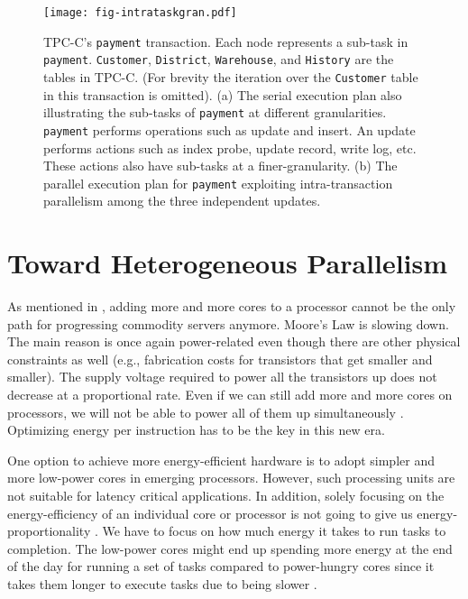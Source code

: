 \documentclass[11pt]{article}
\begin{document}
\begin{figure}
\centering
\texttt{[image: fig-intrataskgran.pdf]}
\caption{TPC-C's \texttt{payment} transaction.
Each node represents a sub-task in \texttt{payment}.
\texttt{Customer}, \texttt{District}, \texttt{Warehouse}, and \texttt{History} are the tables in TPC-C.
(For brevity the iteration over the \texttt{Customer} table in this transaction is omitted).
(a) The serial execution plan also illustrating the sub-tasks of \texttt{payment} at different granularities.
\texttt{payment} performs operations such as update and insert.
An update performs actions such as index probe, update record, write log, etc.
These actions also have sub-tasks at a finer-granularity.
(b) The parallel execution plan for \texttt{payment}
exploiting intra-transaction parallelism among the three independent updates.}
\label{fig:intratask}
\end{figure}

\section{Toward Heterogeneous Parallelism}
\label{sec:het}

As mentioned in ,
adding more and more cores to a processor cannot be the only path for progressing commodity servers anymore.
Moore's Law is slowing down.
The main reason is once again power-related even though there are other physical constraints as well
(e.g., fabrication costs for transistors that get smaller and smaller).
The supply voltage required to power all the transistors up does not decrease at a proportional rate.
Even if we can still add more and more cores on processors,
we will not be able to power all of them up simultaneously \cite{EsmaeilzadehBASB11}.
Optimizing energy per instruction has to be the key in this new era.

One option to achieve more energy-efficient hardware is to adopt simpler and more low-power cores in emerging processors.
However, such processing units are not suitable for latency critical applications.
In addition, solely focusing on the energy-efficiency of an individual core or processor
is not going to give us energy-proportionality \cite{BarrosoH07}.
We have to focus on how much energy it takes to run tasks to completion.
The low-power cores might end up spending more energy at the end of the day for running a set of tasks 
compared to power-hungry cores since it takes them longer to execute tasks due to being slower \cite{LangPS10}.
\end{document}
